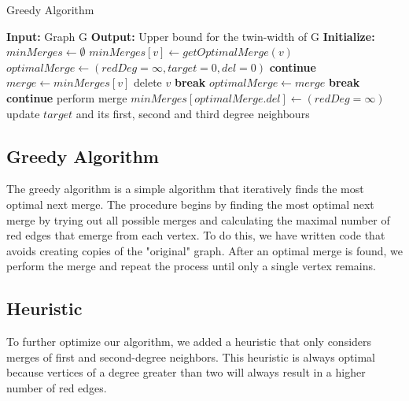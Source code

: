 \documentclass[10pt]{article}
\begin{document}
\begin{algorithm}[H]
    \caption{Greedy Algorithm}
    \label{alg:greedy}
    \begin{algorithmic}[1]
        \State \textbf{Input:} Graph G
        \State \textbf{Output:} Upper bound for the twin-width of G
        \State \textbf{Initialize:} $minMerges \gets \emptyset$
        \State $minMerges[v] \gets getOptimalMerge(v)$
        \EndFor
        \State $optimalMerge \gets (redDeg = \infty, target = 0, del = 0)$
        \State \textbf{continue}
        \EndIf
        \State $merge \gets minMerges[v]$
        \State delete $v$
        \State \textbf{break}
        \EndIf
        \State $optimalMerge \gets merge$
        \EndIf
        \State \textbf{break}
        \EndIf
        \EndFor
        \State \textbf{continue}
        \EndIf
        \State perform merge
        \State $minMerges[optimalMerge.del] \gets (redDeg = \infty)$
        \State update $target$ and its first, second and third degree neighbours
        \EndFor
    \end{algorithmic}
\end{algorithm}

\subsection{Greedy Algorithm}
The greedy algorithm is a simple algorithm that iteratively finds the most optimal next
merge. The procedure begins by finding the most optimal next merge by trying out all
possible merges and calculating the maximal number of red edges that emerge from each
vertex. To do this, we have written code that avoids creating copies of the "original"
graph. After an optimal merge is found, we perform the merge and repeat the process until
only a single vertex remains.

\subsection{Heuristic}
To further optimize our algorithm, we added a heuristic that only considers merges of
first and second-degree neighbors. This heuristic is always optimal because vertices of
a degree greater than two will always result in a higher number of red edges.
\end{document}
